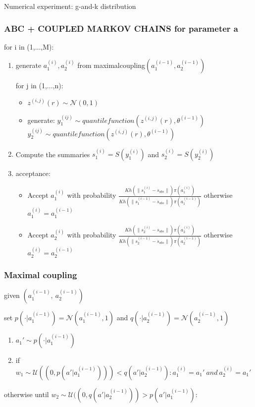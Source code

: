 \documentclass{beamer}
\begin{document}
\begin{section}{Numerical experiment: g-and-k distribution}
\begin{frame}
\end{frame}
\begin{frame}
	\frametitle{ABC + COUPLED MARKOV CHAINS for parameter a}
	for i in (1,...,M):
	\begin{enumerate}
	\item 	generate $a_{1}^{(i)},a_{2}^{(i)}$  from maximalcoupling$(a_{1}^{(i-1)},a_{2}^{(i-1)})$
	
	\begin{block}
		
	 for j in (1,...,n):
	\begin{itemize}
	\item $z^{(i,j)}(r) \sim \mathcal{N}(0,1)$
	\item generate:
	$ y_{1}^{(ij)} \sim quantile function(z^{(i,j)}(r), \theta^{(i-1)})$
	$ y_{2}^{(ij)} \sim quantile function(z^{(i,j)}(r), \theta^{(i-1)})$
	
	\end{itemize}
	\end{block}
	\item Compute the summaries  $ s_{1}^{(i)} =S(y_{1}^{(i)})$ and $ s_{2}^{(i)} =S(y_{2}^{(i)})$


	\item acceptance:
	\begin{itemize}
	\item Accept $a_{1}^{(i)}$ with probability $\frac{Kh(\|s_{1}^{(i)}-s_{obs}\|)\pi(a_{1}^{(i)})}{Kh(\|s_{1}^{(i-1)}- s_{obs}\|)\pi(a_{1}^{(i-1)})} $   otherwise $a_{1}^{(i)}=a_{1}^{(i-1)}$
	
	\item Accept $a_{2}^{(i)}$ with probability $\frac{Kh(\|s_{2}^{(i)}-s_{obs}\|)\pi(a_{2}^{(i)})}{Kh(\|s_{2}^{(i-1)}-s_{obs}\|)\pi(a_{2}^{(i-1)})} $  otherwise $  a_{2}^{(i)}=a_{2}^{(i-1)}$
	\end{itemize}
\end{enumerate}
\end{frame}

\begin{frame}
	\frametitle{Maximal coupling}
	given  $(a_{1}^{(i-1)}, \ a_{2}^{(i-1)})$
	
	set	$p( \cdot |a_{1}^{(i-1)})= \mathcal{N}(a_{1}^{(i-1)},1)$ and $q( \cdot |a_{2}^{(i-1)})= \mathcal{N}(a_{2}^{(i-1)},1)$
		\begin{enumerate}
		\item $ a_{1}' \sim p( \cdot |a_{1}^{(i-1)} ) $
		
		\item if $ w_{1}\sim \mathcal{U}((0, p(a'|a_{1}^{(i-1)}))) < q(a'|a_{2}^{(i-1)} ): a_{1}^{(i)}=a_{1}' \ and \ a_{2}^{(i)}= a_{1}'$
		\end{enumerate}
	otherwise until $ w_{2}\sim \mathcal{U}((0, q(a'|a_{2}^{(i-1)})) > p(a'|a_{1}^{(i-1)} )$:


\end{frame}
\end{section}
\end{document}
